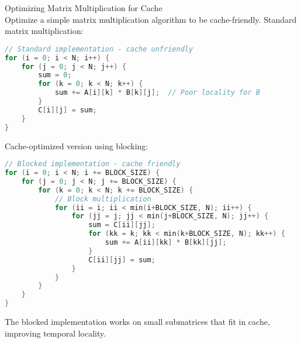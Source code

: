 \begin{example2}{Optimizing Matrix Multiplication for Cache}\\
Optimize a simple matrix multiplication algorithm to be cache-friendly.
\tcblower
Standard matrix multiplication:
\begin{lstlisting}[language=C, style=basesmol]
// Standard implementation - cache unfriendly
for (i = 0; i < N; i++) {
    for (j = 0; j < N; j++) {
        sum = 0;
        for (k = 0; k < N; k++) {
            sum += A[i][k] * B[k][j];  // Poor locality for B
        }
        C[i][j] = sum;
    }
}
\end{lstlisting}

Cache-optimized version using blocking:
\begin{lstlisting}[language=C, style=basesmol]
// Blocked implementation - cache friendly
for (i = 0; i < N; i += BLOCK_SIZE) {
    for (j = 0; j < N; j += BLOCK_SIZE) {
        for (k = 0; k < N; k += BLOCK_SIZE) {
            // Block multiplication
            for (ii = i; ii < min(i+BLOCK_SIZE, N); ii++) {
                for (jj = j; jj < min(j+BLOCK_SIZE, N); jj++) {
                    sum = C[ii][jj];
                    for (kk = k; kk < min(k+BLOCK_SIZE, N); kk++) {
                        sum += A[ii][kk] * B[kk][jj];
                    }
                    C[ii][jj] = sum;
                }
            }
        }
    }
}
\end{lstlisting}

The blocked implementation works on small submatrices that fit in cache, improving temporal locality.
\end{example2}